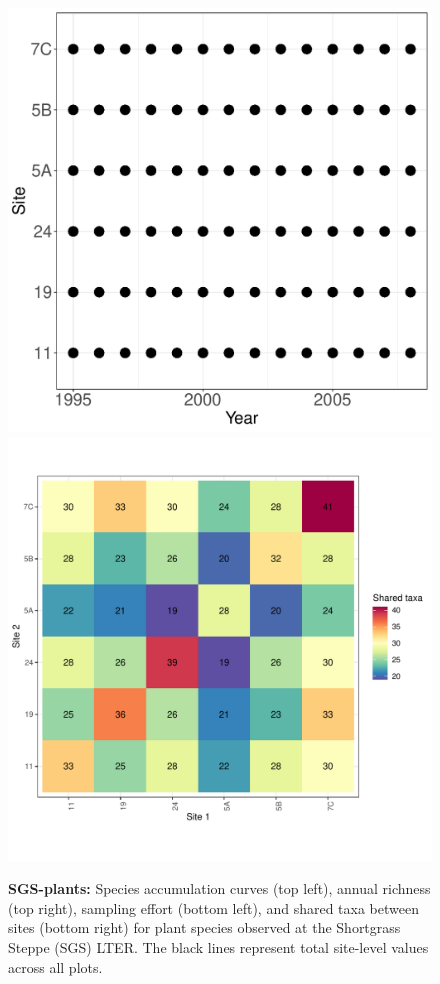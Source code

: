 \documentclass[11pt, oneside]{article}
\begin{document}
\begin{figure}[h!]
\includegraphics[scale = 0.4]{sgs-plants-compagnoni_spatiotemporal_sampling_effort.pdf}
\includegraphics[scale = 0.4]{sgs-plants-compagnoni_spp_shared.pdf}
\caption{{\bf SGS-plants:} Species accumulation curves (top left),  annual richness (top right), sampling effort (bottom left), and shared taxa between sites (bottom right) for plant species observed at the Shortgrass Steppe (SGS) LTER. The black lines represent total site-level values across all plots.}
\label{sgs-plants-compagnoni}
\end{figure}
\end{document}
